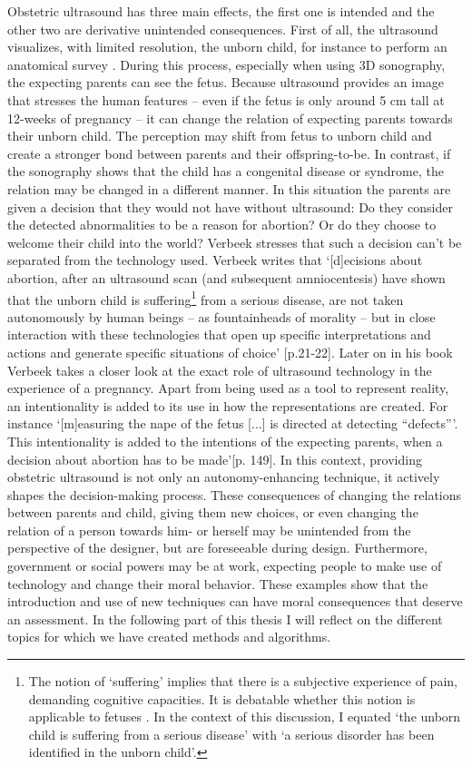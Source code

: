 Obstetric ultrasound has three main effects, the first one is intended and the other two are derivative unintended consequences. 
First of all, the ultrasound visualizes, with limited resolution, the unborn child, for instance to perform an anatomical survey \cite{Platt_2013,Bahtiyar_2015}. 
During this process, especially when using 3D sonography, the expecting parents can see the fetus. Because ultrasound provides an image that stresses the human features – even if the fetus is only around 5 cm tall at 12-weeks of pregnancy – it can change the relation of expecting parents towards their unborn child. 
The perception may shift from fetus to unborn child and create a stronger bond between parents and their offspring-to-be. 
In contrast, if the sonography shows that the child has a congenital disease or syndrome, the relation may be changed in a different manner. 
In this situation the parents are given a decision that they would not have without ultrasound: Do they consider the detected abnormalities to be a reason for abortion? 
Or do they choose to welcome their child into the world? Verbeek stresses that such a decision can’t be separated from the technology used. 
Verbeek writes that ‘[d]ecisions about abortion, after an ultrasound scan (and subsequent amniocentesis) have shown that the unborn child is suffering\footnote{The notion of ‘suffering’ implies that there is a subjective experience of pain, demanding cognitive capacities. It is debatable whether this notion is applicable to fetuses \cite{Derbyshire_2006}. In the context of this discussion, I equated ‘the unborn child is suffering from a serious disease’ with ‘a serious disorder has been identified in the unborn child’.} from a serious disease, are not taken autonomously by human beings – as fountainheads of morality – but in close interaction with these technologies that open up specific interpretations and actions and generate specific situations of choice’ \cite{Verbeek_2011}[p.21-22]. 
Later on in his book Verbeek takes a closer look at the exact role of ultrasound technology in the experience of a pregnancy. 
Apart from being used as a tool to represent reality, an intentionality is added to its use in how the representations are created. 
For instance ‘[m]easuring the nape of the fetus [...] is directed at detecting “defects”’. 
This intentionality is added to the intentions of the expecting parents, when a decision about abortion has to be made’[p. 149]. 
In this context, providing obstetric ultrasound is not only an autonomy-enhancing technique, it actively shapes the decision-making process. 
These consequences of changing the relations between parents and child, giving them new choices, or even changing the relation of a person towards him- or herself may be unintended from the perspective of the designer, but are foreseeable during design. 
Furthermore, government or social powers may be at work, expecting people to make use of technology and change their moral behavior.
These examples show that the introduction and use of new techniques can have moral consequences that deserve an assessment. 
In the following part of this thesis I will reflect on the different topics for which we have created methods and algorithms. 

